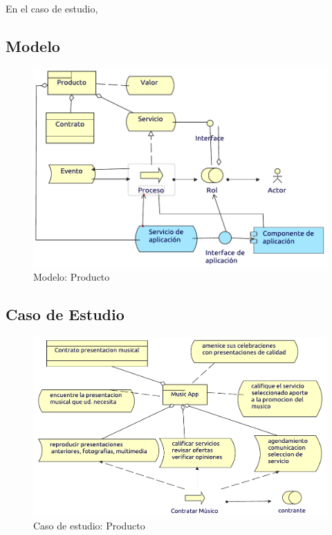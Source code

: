 En el caso de estudio, 
\subsection{Modelo}
\begin{figure}[h!]
	\centering
	\includegraphics[width=\linewidth]{Arquitectura/Negocio/imgs/ProductoMetamodelo.pdf}
	\caption{Modelo: Producto}
\end{figure}
\newpage
\subsection{Caso de Estudio}

\begin{figure}[h!]
	\centering
	\includegraphics[width=\linewidth]{Arquitectura/Negocio/imgs/Producto.pdf}
	\caption{Caso de estudio: Producto}
\end{figure}
\newpage

